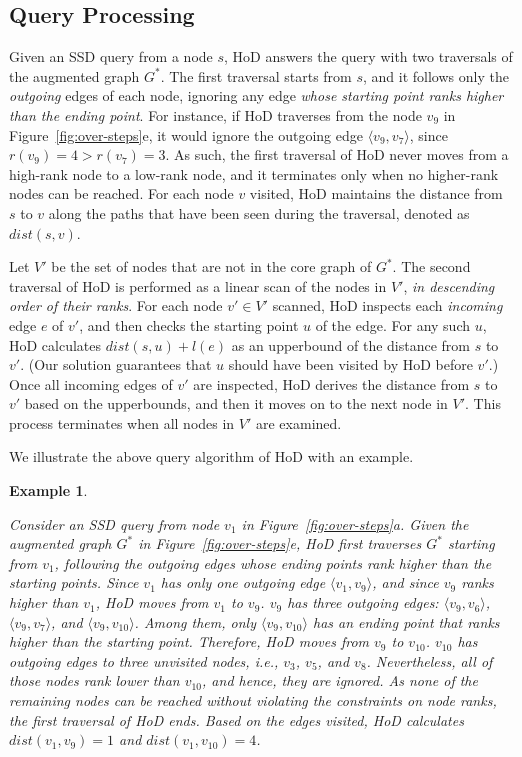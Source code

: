 \documentclass{sig-alternate}
\newtheorem{example} {Example}
\def\vgap{\vspace{0mm}}
\def\G{G^*}
\def\d{dist}
\begin{document}
\begin{sloppy}
\subsection{Query Processing} \label{sec:overview-query}

Given an SSD query from a node $s$, HoD answers the query with two traversals of the augmented graph $\G$. The first traversal starts from $s$, and it follows only the {\em outgoing} edges of each node, ignoring any edge {\em whose starting point ranks higher than the ending point}. For instance, if HoD traverses from the node $v_9$ in Figure~\ref{fig:over-steps}e, it would ignore the outgoing edge $\langle v_9, v_7\rangle$, since $r(v_9) = 4 > r(v_7) = 3$. As such, the first traversal of HoD never moves from a high-rank node to a low-rank node, and it terminates only when no higher-rank nodes can be reached. For each node $v$ visited, HoD maintains the distance from $s$ to $v$ along the paths that have been seen during the traversal, denoted as $\d(s, v)$.

Let $V'$ be the set of nodes that are not in the core graph of $\G$. The second traversal of HoD is performed as a linear scan of the nodes in $V'$, {\em in descending order of their ranks}. For each node $v' \in V'$ scanned, HoD inspects each {\em incoming} edge $e$ of $v'$, and then checks the starting point $u$ of the edge. For any such $u$, HoD calculates $\d(s, u) + l(e)$ as an upperbound of the distance from $s$ to $v'$. (Our solution guarantees that $u$ should have been visited by HoD before $v'$.) Once all incoming edges of $v'$ are inspected, HoD derives the distance from $s$ to $v'$ based on the upperbounds, and then it moves on to the next node in $V'$. This process terminates when all nodes in $V'$ are examined.

We illustrate the above query algorithm of HoD with an example.


\vgap

\begin{example} \label{example:over-query}

\em Consider an SSD query from node $v_1$ in Figure~\ref{fig:over-steps}a. Given the augmented graph $\G$ in Figure~\ref{fig:over-steps}e, HoD first traverses $\G$ starting from $v_1$, following the outgoing edges whose ending points rank higher than the starting points. Since $v_1$ has only one outgoing edge $\langle v_1, v_9\rangle$, and since $v_9$ ranks higher than $v_1$, HoD moves from $v_1$ to $v_9$. $v_9$ has three outgoing edges: $\langle v_9, v_6\rangle$, $\langle v_9, v_7\rangle$, and $\langle v_9, v_{10}\rangle$. Among them, only $\langle v_9, v_{10}\rangle$ has an ending point that ranks higher than the starting point. Therefore, HoD moves from $v_9$ to $v_{10}$. $v_{10}$ has outgoing edges to three unvisited nodes, i.e., $v_3$, $v_5$, and $v_8$. Nevertheless, all of those nodes rank lower than $v_{10}$, and hence, they are ignored. As none of the remaining nodes can be reached without violating the constraints on node ranks, the first traversal of HoD ends. Based on the edges visited, HoD calculates $\d(v_1, v_9) = 1$ and $\d(v_1, v_{10}) = 4$.


\end{example}
\end{sloppy}
\end{document}
